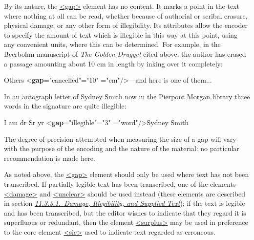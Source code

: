 \par
By its nature, the \hyperref[TEI.gap]{<gap>} element has no content. It marks a point in the text where nothing at all can be read, whether because of authorial or scribal erasure, physical damage, or any other form of illegibility. Its attributes allow the encoder to specify the amount of text which is illegible in this way at this point, using any convenient units, where this can be determined. For example, in the Beerbohm manuscript of \textit{The Golden Drugget} cited above, the author has erased a passage amounting about 10 cm in length by inking over it completely: \par\bgroup{}\exampleFont \begin{shaded}\noindent\mbox{}Others {<\textbf{gap}\hspace*{1em}{reason}="{cancelled}"\hspace*{1em}{quantity}="{10}"\mbox{}\newline 
\hspace*{1em}{unit}="{cm}"/>}—and here is one of\mbox{}\newline 
 them...\end{shaded}\egroup\par \par
In an autograph letter of Sydney Smith now in the Pierpont Morgan library three words in the signature are quite illegible: \par\bgroup{}\exampleFont \begin{shaded}\noindent\mbox{}I am dr Sr yr {<\textbf{gap}\hspace*{1em}{reason}="{illegible}"\hspace*{1em}{quantity}="{3}"\mbox{}\newline 
\hspace*{1em}{unit}="{word}"/>}Sydney Smith\end{shaded}\egroup\par \noindent  The degree of precision attempted when measuring the size of a gap will vary with the purpose of the encoding and the nature of the material: no particular recommendation is made here.\par
As noted above, the \hyperref[TEI.gap]{<gap>} element should only be used where text has not been transcribed. If partially legible text has been transcribed, one of the elements \hyperref[TEI.damage]{<damage>} and \hyperref[TEI.unclear]{<unclear>} should be used instead (these elements are described in section \textit{\hyperref[PHDA]{11.3.3.1.\ Damage, Illegibility, and Supplied Text}}); if the text is legible and has been transcribed, but the editor wishes to indicate that they regard it is superfluous or redundant, then the element \hyperref[TEI.surplus]{<surplus>} may be used in preference to the core element \hyperref[TEI.sic]{<sic>} used to indicate text regarded as erroneous.\par
